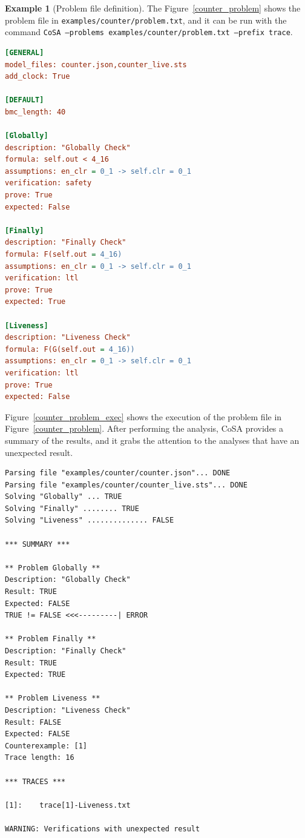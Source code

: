 \documentclass{article}
\theoremstyle{definition}
\newtheorem{example}{Example}[section]
\begin{document}
\begin{example}[Problem file definition]
The Figure~\ref{counter_problem} shows the problem file in
\texttt{examples/counter/problem.txt}, and it can be run with the
command \texttt{CoSA --problems examples/counter/problem.txt --prefix
  trace}.
  
\begin{lstlisting}[frame=single,language=Ini,caption=Problem file in \texttt{examples/counter/problem.txt},label=counter_problem]
[GENERAL]
model_files: counter.json,counter_live.sts
add_clock: True

[DEFAULT]
bmc_length: 40

[Globally]
description: "Globally Check"
formula: self.out < 4_16
assumptions: en_clr = 0_1 -> self.clr = 0_1
verification: safety
prove: True
expected: False

[Finally]
description: "Finally Check"
formula: F(self.out = 4_16)
assumptions: en_clr = 0_1 -> self.clr = 0_1
verification: ltl
prove: True
expected: True

[Liveness]
description: "Liveness Check"
formula: F(G(self.out = 4_16))
assumptions: en_clr = 0_1 -> self.clr = 0_1
verification: ltl
prove: True
expected: False
\end{lstlisting}

Figure~\ref{counter_problem_exec} shows the execution of the problem
file in Figure~\ref{counter_problem}. After performing the analysis,
CoSA provides a summary of the results, and it grabs the attention to
the analyses that have an unexpected result.

\begin{lstlisting}[frame=single,language=ets,caption=Analysis for the problem in Figure~\ref{counter_problem},label=counter_problem_exec]
Parsing file "examples/counter/counter.json"... DONE
Parsing file "examples/counter/counter_live.sts"... DONE
Solving "Globally" ... TRUE
Solving "Finally" ........ TRUE
Solving "Liveness" .............. FALSE

*** SUMMARY ***

** Problem Globally **
Description: "Globally Check"
Result: TRUE
Expected: FALSE
TRUE != FALSE <<<---------| ERROR

** Problem Finally **
Description: "Finally Check"
Result: TRUE
Expected: TRUE

** Problem Liveness **
Description: "Liveness Check"
Result: FALSE
Expected: FALSE
Counterexample: [1]
Trace length: 16

*** TRACES ***

[1]:	trace[1]-Liveness.txt

WARNING: Verifications with unexpected result
\end{lstlisting}

\end{example}
\end{document}
